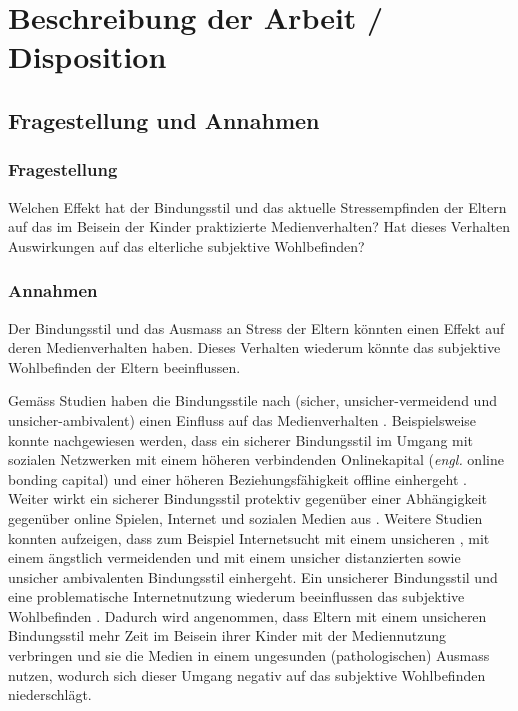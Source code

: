 \section{Beschreibung der Arbeit / Disposition}
\subsection{Fragestellung und Annahmen}
\subsubsection{Fragestellung}
Welchen Effekt hat der Bindungsstil und das aktuelle Stressempfinden der Eltern auf das im Beisein der Kinder praktizierte Medienverhalten? Hat dieses Verhalten Auswirkungen auf das elterliche subjektive Wohlbefinden?
\subsubsection{Annahmen}
Der Bindungsstil und das Ausmass an Stress der Eltern könnten einen Effekt auf deren Medienverhalten haben. Dieses Verhalten wiederum könnte das subjektive Wohlbefinden der Eltern beeinflussen.

Gemäss Studien haben die Bindungsstile nach  (sicher, unsicher-vermeidend und unsicher-ambivalent) einen Einfluss auf das Medienverhalten \cite{Lin2015, Monacis2017}. Beispielsweise konnte nachgewiesen werden, dass ein sicherer Bindungsstil im Umgang mit sozialen Netzwerken mit einem höheren verbindenden Onlinekapital (\textit{engl. }online bonding capital) und einer höheren Beziehungsfähigkeit offline  einhergeht \cite{Lin2015}. Weiter wirkt ein sicherer Bindungsstil protektiv gegenüber einer Abhängigkeit gegenüber online Spielen, Internet und sozialen Medien aus \cite{Monacis2017}.  
Weitere Studien konnten aufzeigen, dass zum Beispiel Internetsucht mit einem unsicheren \cite{Lin2011, Severino2013}, mit einem ängstlich vermeidenden \cite{Shin2011} und mit einem unsicher distanzierten sowie unsicher ambivalenten Bindungsstil \cite{Odaci2014} einhergeht. Ein unsicherer Bindungsstil und eine problematische Internetnutzung wiederum beeinflussen das subjektive Wohlbefinden \cite{Odaci2014}.	 
Dadurch wird angenommen, dass Eltern mit einem unsicheren Bindungsstil mehr Zeit im Beisein ihrer Kinder mit der Mediennutzung verbringen und sie die Medien in einem ungesunden (pathologischen) Ausmass nutzen, wodurch sich dieser Umgang negativ auf das subjektive Wohlbefinden niederschlägt.  

